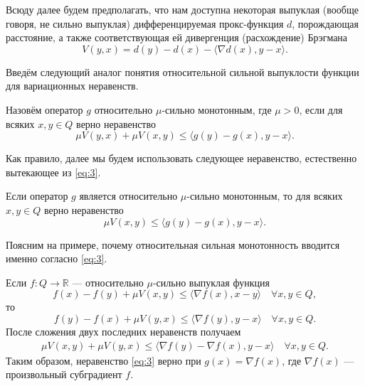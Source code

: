     Всюду далее будем предполагать, что нам доступна некоторая выпуклая (вообще говоря, не сильно выпуклая) дифференцируемая прокс-функция $d$, порождающая расстояние, а также соответствующая ей дивергенция (расхождение) Брэгмана \cite{Bauschke}
    \begin{equation}\label{Brg_form}
        V(y, x) = d(y) - d(x) - \langle \nabla d(x), y - x \rangle.
    \end{equation}

    Введём следующий аналог понятия относительной сильной выпуклости функции \cite{Lu_Nesterov_2018} для вариационных неравенств.
    \begin{definition}\label{DefRelStrongMonot}
        Назовём оператор $g$ относительно $\mu$-сильно монотонным, где $\mu >0$, если для всяких $x, y \in Q$ верно неравенство
        \begin{equation}\label{eq:3}
             \mu V(y, x) + \mu V(x, y) \leq \langle g(y) - g(x), y - x \rangle.
         \end{equation}
    \end{definition}
    Как правило, далее мы будем использовать следующее неравенство, естественно вытекающее из \eqref{eq:3}.
    \begin{remark}
        Если оператор $g$ является  относительно $\mu$-сильно монотонным, то для всяких $x, y \in Q$ верно неравенство
        $$
            \mu V(x, y) \leq \langle g(y) - g(x), y - x \rangle.
        $$
    \end{remark}

    Поясним на примере, почему относительная сильная монотонность вводится именно согласно  \eqref{eq:3}.
    \begin{example}
        Если $f: Q \longrightarrow \mathbb{R}$ --- относительно $\mu$-сильно выпуклая функция
        \begin{equation}\label{eqrelativestorngconv}
            f(x) - f(y) + \mu V(x, y) \leq \langle \nabla{f(x)}, x - y \rangle \quad   \forall x, y \in Q,
        \end{equation}
        то
        \begin{equation}
            f(y) - f(x) + \mu V(y, x) \leq \langle \nabla{f(y)}, y - x \rangle \quad   \forall x, y \in Q.
        \end{equation}
        После сложения двух последних неравенств получаем
        \begin{align*}
            \mu V(x, y) + \mu V(y, x)\leq \langle \nabla{f(y)} - \nabla{f(x)}, y - x \rangle \quad  \forall x, y \in Q.
        \end{align*}
        Таким образом, неравенство \eqref{eq:3} верно при $g(x) = \nabla{f(x)}$, где $\nabla{f(x)}$ --- произвольный субградиент $f$.
    \end{example}

